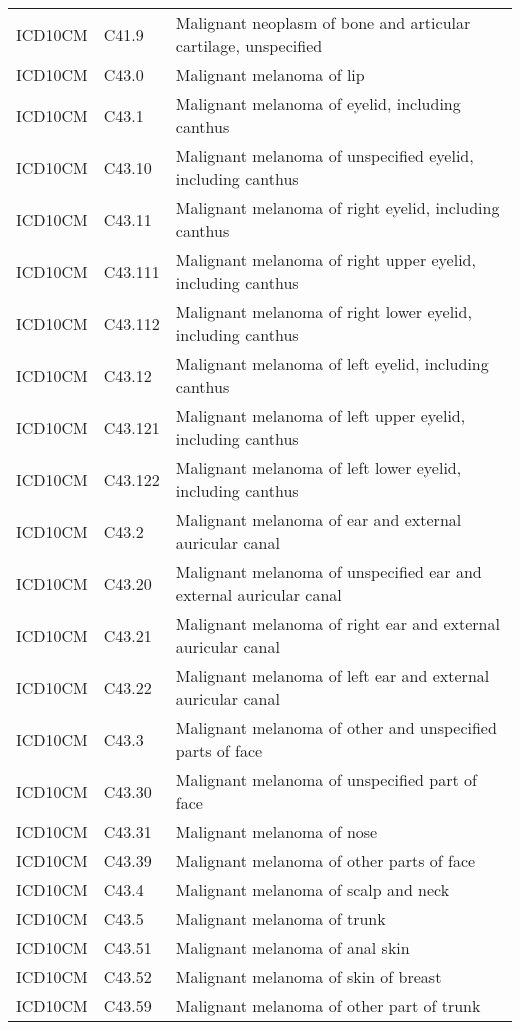 \begin{longtable}{p{}p{}p{}}
  ICD10CM & C41.9 & Malignant neoplasm of bone and articular cartilage, unspecified \\ 
  ICD10CM & C43.0 & Malignant melanoma of lip \\ 
  ICD10CM & C43.1 & Malignant melanoma of eyelid, including canthus \\ 
  ICD10CM & C43.10 & Malignant melanoma of unspecified eyelid, including canthus \\ 
  ICD10CM & C43.11 & Malignant melanoma of right eyelid, including canthus \\ 
  ICD10CM & C43.111 & Malignant melanoma of right upper eyelid, including canthus \\ 
  ICD10CM & C43.112 & Malignant melanoma of right lower eyelid, including canthus \\ 
  ICD10CM & C43.12 & Malignant melanoma of left eyelid, including canthus \\ 
  ICD10CM & C43.121 & Malignant melanoma of left upper eyelid, including canthus \\ 
  ICD10CM & C43.122 & Malignant melanoma of left lower eyelid, including canthus \\ 
  ICD10CM & C43.2 & Malignant melanoma of ear and external auricular canal \\ 
  ICD10CM & C43.20 & Malignant melanoma of unspecified ear and external auricular canal \\ 
  ICD10CM & C43.21 & Malignant melanoma of right ear and external auricular canal \\ 
  ICD10CM & C43.22 & Malignant melanoma of left ear and external auricular canal \\ 
  ICD10CM & C43.3 & Malignant melanoma of other and unspecified parts of face \\ 
  ICD10CM & C43.30 & Malignant melanoma of unspecified part of face \\ 
  ICD10CM & C43.31 & Malignant melanoma of nose \\ 
  ICD10CM & C43.39 & Malignant melanoma of other parts of face \\ 
  ICD10CM & C43.4 & Malignant melanoma of scalp and neck \\ 
  ICD10CM & C43.5 & Malignant melanoma of trunk \\ 
  ICD10CM & C43.51 & Malignant melanoma of anal skin \\ 
  ICD10CM & C43.52 & Malignant melanoma of skin of breast \\ 
  ICD10CM & C43.59 & Malignant melanoma of other part of trunk \\ 

\end{longtable}
